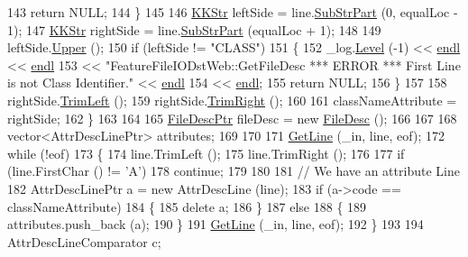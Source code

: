 \begin{DoxyCode}
143       \textcolor{keywordflow}{return}  NULL;
144     \}
145 
146     \hyperlink{class_k_k_b_1_1_k_k_str}{KKStr}  leftSide  = line.\hyperlink{class_k_k_b_1_1_k_k_str_a5f20b2ddfc9f07c8ef99592810332ddb}{SubStrPart} (0, equalLoc - 1);
147     \hyperlink{class_k_k_b_1_1_k_k_str}{KKStr}  rightSide = line.\hyperlink{class_k_k_b_1_1_k_k_str_a5f20b2ddfc9f07c8ef99592810332ddb}{SubStrPart} (equalLoc + 1);
148 
149     leftSide.\hyperlink{class_k_k_b_1_1_k_k_str_a66ea0feabc94da88591b56a683695bd9}{Upper} ();
150     \textcolor{keywordflow}{if}  (leftSide != \textcolor{stringliteral}{"CLASS"})
151     \{
152       \_log.\hyperlink{class_k_k_b_1_1_run_log_a32cf761d7f2e747465fd80533fdbb659}{Level} (-1) << \hyperlink{namespace_k_k_b_ad1f50f65af6adc8fa9e6f62d007818a8}{endl} << \hyperlink{namespace_k_k_b_ad1f50f65af6adc8fa9e6f62d007818a8}{endl}
153                       << \textcolor{stringliteral}{"FeatureFileIODstWeb::GetFileDesc     *** ERROR ***   First Line is not Class
       Identifier."} << \hyperlink{namespace_k_k_b_ad1f50f65af6adc8fa9e6f62d007818a8}{endl}
154                       << \hyperlink{namespace_k_k_b_ad1f50f65af6adc8fa9e6f62d007818a8}{endl};
155       \textcolor{keywordflow}{return}  NULL;
156     \}
157 
158     rightSide.\hyperlink{class_k_k_b_1_1_k_k_str_af7c102c53103ddff3f48270b4a198c89}{TrimLeft} ();
159     rightSide.\hyperlink{class_k_k_b_1_1_k_k_str_aa912161f17871e2d6fec7bbac033221c}{TrimRight} ();
160 
161     classNameAttribute = rightSide;
162   \}
163 
164 
165   \hyperlink{class_k_k_m_l_l_1_1_file_desc}{FileDescPtr}  fileDesc = \textcolor{keyword}{new} \hyperlink{class_k_k_m_l_l_1_1_file_desc}{FileDesc} ();
166 
167 
168   vector<AttrDescLinePtr> attributes;
169 
170 
171   \hyperlink{class_k_k_m_l_l_1_1_feature_file_i_o_a61ca11485d2c14368c1019bfcc53ab16}{GetLine} (\_in, line, eof);
172   \textcolor{keywordflow}{while}  (!eof)
173   \{
174     line.TrimLeft ();
175     line.TrimRight ();
176 
177     \textcolor{keywordflow}{if}  (line.FirstChar () != \textcolor{charliteral}{'A'})
178       \textcolor{keywordflow}{continue};
179 
180 
181     \textcolor{comment}{// We have an attribute Line}
182     AttrDescLinePtr  a = \textcolor{keyword}{new} AttrDescLine (line);
183     \textcolor{keywordflow}{if}  (a->code == classNameAttribute)
184     \{
185       \textcolor{keyword}{delete}  a;
186     \}
187     \textcolor{keywordflow}{else}
188     \{
189       attributes.push\_back (a);
190     \}
191     \hyperlink{class_k_k_m_l_l_1_1_feature_file_i_o_a61ca11485d2c14368c1019bfcc53ab16}{GetLine} (\_in, line, eof);
192   \}
193 
194   AttrDescLineComparator  c;

\end{DoxyCode}

